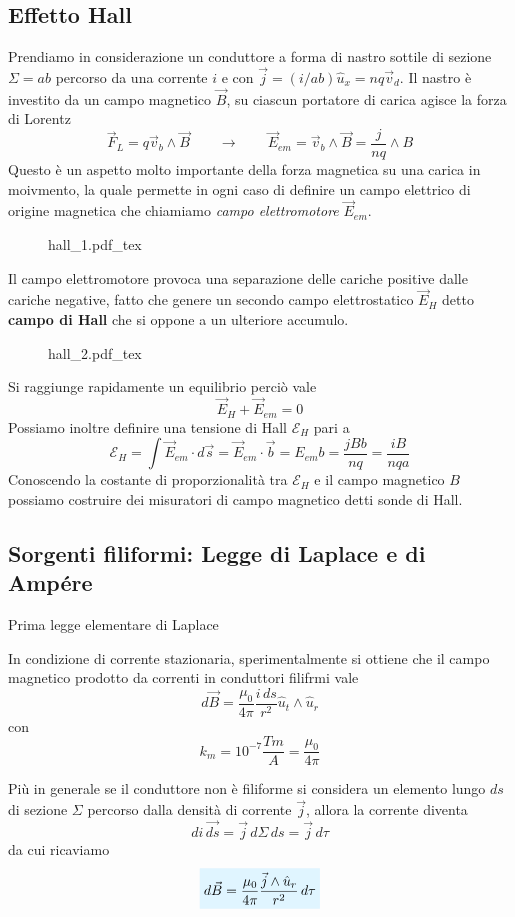 \documentclass[x11names]{report}
\newcommand{\teorema}[2]{
	\begin{center}
		\fboxsep11pt
		\colorbox{myred}{\begin{minipage}{5.75in}
				\begin{redes}{#1}
					#2
				\end{redes}
		\end{minipage}}
	\end{center}
}
\newcommand{\incfig}[1]{%
	{#1.pdf_tex}
}
\newcommand{\viola}[1]{%
	\colorbox{myblue}{$\displaystyle #1$}
}
\begin{document}
\subsection{Effetto Hall}
Prendiamo in considerazione un conduttore a forma di nastro sottile di sezione \(\Sigma = ab\) percorso da una corrente \(i\) e con \(\vec{j} = (i/ab) \hat{u}_x = nq\vec{v}_d\). Il nastro è investito da un campo magnetico \(\vec{B}\), su ciascun portatore di carica agisce la forza di Lorentz
\[
\vec{F}_L = q\vec{v}_b \wedge \vec{B} \qquad \to \qquad \vec{E}_{em} = \vec{v}_b \wedge \vec{B} = \frac{j}{nq} \wedge B
\]
Questo è un aspetto molto importante della forza magnetica su una carica in moivmento, la quale permette in ogni caso di definire un campo elettrico di origine magnetica che chiamiamo \textit{campo elettromotore} \(\vec{E}_{em}\).
\begin{figure}[H]
	\centering
	\incfig{hall_1}
\end{figure}
Il campo elettromotore provoca una separazione delle cariche positive dalle cariche negative, fatto che genere un secondo campo elettrostatico \(\vec{E}_H\) detto \textbf{campo di Hall} che si oppone a un ulteriore accumulo.
\begin{figure}[H]
	\centering
	\incfig{hall_2}
\end{figure}
Si raggiunge rapidamente un equilibrio perciò vale
\[
\vec{E}_H + \vec{E}_{em} = 0
\]
Possiamo inoltre definire una tensione di Hall \(\mathcal{E}_H\) pari a 
\[
\mathcal{E}_H = \int \vec{E}_{em} \cdot d\vec{s} = \vec{E}_{em} \cdot \vec{b} = E_{em}b = \frac{jBb}{nq} = \frac{iB}{nqa}
\]
Conoscendo la costante di proporzionalità tra \(\mathcal{E}_H\) e il campo magnetico \(B\) possiamo costruire dei misuratori di campo magnetico detti sonde di Hall.

\subsection{Sorgenti filiformi: Legge di Laplace e di Ampére}
\teorema{Prima legge elementare di Laplace}{
	In condizione di corrente stazionaria, sperimentalmente si ottiene che il campo magnetico prodotto da correnti in conduttori filifrmi vale
	\begin{equation}
		d\vec{B} = \frac{\mu_0}{4\pi} \frac{i \, ds}{r^2}\hat{u}_t \wedge \hat{u}_r
	\end{equation}
	con 
	\[
	k_m = 10^{-7} \frac{Tm}{A} = \frac{\mu_0}{4\pi}
	\]
}
Più in generale se il conduttore non è filiforme si considera un elemento lungo \(ds\) di sezione \(\Sigma\) percorso dalla densità di corrente \(\vec{j}\), allora la corrente diventa
\[
di \,\vec{ds} = \vec{j} \, d\Sigma \, ds = \vec{j} \, d\tau
\]
da cui ricaviamo
\begin{equation}
	\viola{d\vec{B} = \frac{\mu_0}{4\pi} \frac{\vec{j}\wedge \hat{u}_r}{r^2} \, d\tau}
\end{equation}
\end{document}

